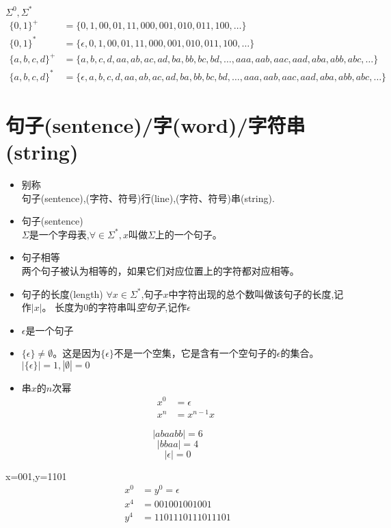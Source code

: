 \begin{example} $\Sigma^0,\Sigma^{\ast}$ 
	\begin{align*}
	\{0,1\}^+ &= \{0,1,00,01,11,000,001,010,011,100,\dots\}\\
	\{0,1\}^{\ast} &= \{\epsilon,0,1,00,01,11,000,001,010,011,100,\dots\}\\
	\{a,b,c,d\}^+ &= \{a,b,c,d,aa,ab,ac,ad,ba,bb,bc,bd,\dots,aaa,aab,aac,aad,aba,abb,abc,\dots\}\\
	\{a,b,c,d\}^{\ast} &= \{\epsilon,a,b,c,d,aa,ab,ac,ad,ba,bb,bc,bd,\dots,aaa,aab,aac,aad,aba,abb,abc,\dots\}
	\end{align*}
\end{example}

\section{句子(sentence)/字(word)/字符串(string)}
\begin{itemize}
	\item 别称\\
		句子(sentence),(字符、符号)行(line),(字符、符号)串(string).
	\item 句子(sentence)\\
		$\Sigma$是一个字母表,$\forall \in \Sigma^{\ast},x$叫做$\Sigma$上的一个句子。
	\item 句子相等\\
		两个句子被认为相等的，如果它们对应位置上的字符都对应相等。
	\item 句子的长度(length)
		\subitem{-} $\forall x\in \Sigma^{\ast}$,句子$x$中字符出现的总个数叫做该句子的长度,记作$|x|$。
		\subitem{-} 长度为0的字符串叫\emph{空句子},记作$\epsilon$
	\item $\epsilon$是一个句子
	\item $\{\epsilon\}\ne \emptyset$。这是因为$\{\epsilon\}$不是一个空集，它是含有一个空句子的$\epsilon$的集合。$|\{\epsilon\}|=1,|\emptyset|=0$
	\item 串$x$的$n$次幂
	\begin{align*}
	x^0 &= \epsilon \\
	x^n &= x^{n-1}x
	\end{align*}
\end{itemize}

\begin{example}
	$$|abaabb|=6$$
	$$|bbaa|=4$$
	$$|\epsilon|=0$$
\end{example}

\begin{example}
	x=001,y=1101
	\begin{align*}
	x^0 &= y^0 = \epsilon \\
	x^4 &= 001001001001 \\
	y^4 &= 1101110111011101
	\end{align*}
\end{example}

